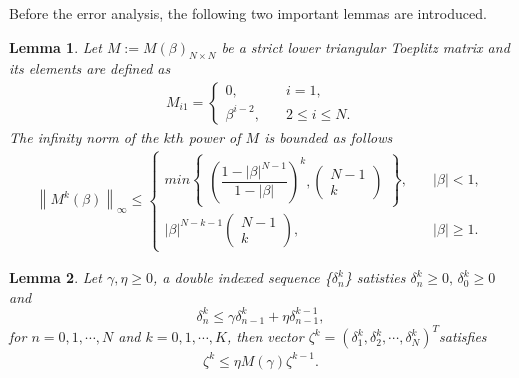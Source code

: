 \documentclass[preprint,12pt]{elsarticle}
\newtheorem{lemma}{Lemma}%
\begin{document}
	Before the error analysis, the following two important lemmas are introduced.
	\begin{lemma}\label{lemma3}
		Let $M:=M(\beta)_{N\times N}$ be a strict lower triangular Toeplitz matrix and its elements are defined as 
		\begin{align*}
			M_{i1}=
			\left\{
			\begin{array}{ll}
				0, & \quad i=1,\\
				\beta^{i-2}, & \quad 2\leq i\leq N.
			\end{array}
			\right.
		\end{align*}
		The infinity norm of the $kth$ power of $M$ is bounded as follows
		\begin{align*}
			\left\|M^{k}(\beta)\right\|_{\infty}\leq
			\left\{
			\begin{array}{ll}
				min
				\begin{Bmatrix}
					\left(\dfrac{1-|\beta|^{N-1}}{1-|\beta|}\right)^{k},
					\begin{pmatrix}
						N-1\\
						k
					\end{pmatrix}
				\end{Bmatrix}, &\quad |\beta|<1,\\
				|\beta|^{N-k-1}
				\begin{pmatrix}
					N-1\\
					k
				\end{pmatrix} ,&\quad |\beta| \geq 1.
			\end{array}
			\right.
		\end{align*}
	\end{lemma}
	\begin{lemma}\label{lemma4}
		Let $\gamma,\eta\geq0$, a double indexed sequence \{$\delta_{n}^{k}$\} satisties $\delta_{n}^{k}\geq 0,\,\delta_{0}^{k}\geq 0$ and
		\begin{equation*}
			\delta_{n}^{k}\leq \gamma\delta_{n-1}^{k}+\eta\delta_{n-1}^{k-1},
		\end{equation*}
		for $n=0,1,\cdots,N$ and $k=0,1,\cdots,K$, then vector $\zeta^{k}=(\delta_{1}^{k},\delta_{2}^{k},\cdots,\delta_{N}^{k})^{T} $satisfies
		\begin{align*}
			\zeta^{k}\leq \eta M(\gamma)\zeta^{k-1}.
		\end{align*}
	\end{lemma}
\end{document}
